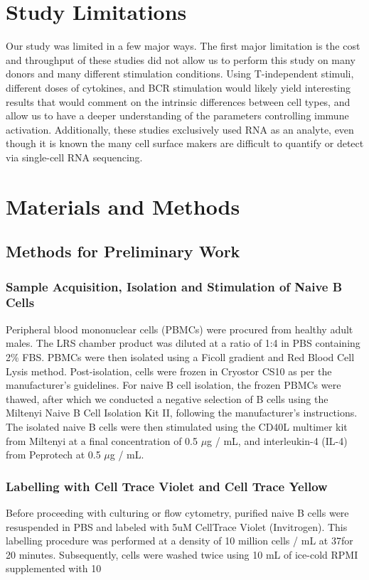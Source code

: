 \section{Study Limitations}
Our study was limited in a few major ways. The first major limitation is the cost and throughput of these studies did not allow us to perform this study on many donors and many different stimulation conditions. Using T-independent stimuli, different doses of cytokines, and BCR stimulation would likely yield interesting results that would comment on the intrinsic differences between cell types, and allow us to have a deeper understanding of the parameters controlling immune activation. Additionally, these studies exclusively used RNA as an analyte, even though it is known the many cell surface makers are difficult to quantify or detect via single-cell RNA sequencing.

\section{Materials and Methods}

\subsection{Methods for Preliminary Work}
\subsubsection{Sample Acquisition, Isolation and Stimulation of Naive B Cells}
Peripheral blood mononuclear cells (PBMCs) were procured from healthy adult males. The LRS chamber product was diluted at a ratio of 1:4 in PBS containing 2\% FBS. PBMCs were then isolated using a Ficoll gradient and Red Blood Cell Lysis method. Post-isolation, cells were frozen in Cryostor CS10 as per the manufacturer's guidelines. For naive B cell isolation, the frozen PBMCs were thawed, after which we conducted a negative selection of B cells using the Miltenyi Naive B Cell Isolation Kit II, following the manufacturer's instructions. The isolated naive B cells were then stimulated using the CD40L multimer kit from Miltenyi at a final concentration of 0.5 $\mu$g / mL, and interleukin-4 (IL-4) from Peprotech at 0.5 $\mu$g / mL.

\subsubsection{Labelling with Cell Trace Violet and Cell Trace Yellow}
Before proceeding with culturing or flow cytometry, purified naive B cells were resuspended in PBS and labeled with 5uM CellTrace Violet (Invitrogen). This labelling procedure was performed at a density of 10 million cells / mL at 37\celsius for 20 minutes. Subsequently, cells were washed twice using 10 mL of ice-cold RPMI supplemented with 10%

